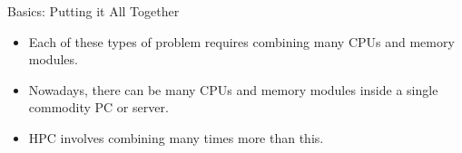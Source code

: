 
\begin{frame}{Basics: Putting it All Together}
\begin{itemize}
\item{Each of these types of problem requires \alert{combining many CPUs and memory modules}.}
\pause
\item{Nowadays, there can be many CPUs and memory modules inside a \alert{single commodity PC or server}.}
  \pause
\item{HPC involves combining \alert{many times more than this}.}
\end{itemize}
\end{frame}
 




